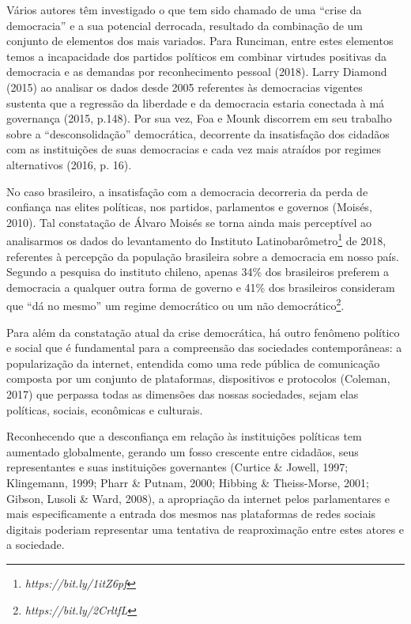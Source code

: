 Vários autores têm investigado o que tem sido chamado de uma ``crise da
democracia'' e a sua potencial derrocada, resultado da combinação de um
conjunto de elementos dos mais variados. Para Runciman, entre estes
elementos temos a incapacidade dos partidos políticos em combinar
virtudes positivas da democracia e as demandas por reconhecimento
pessoal (2018). Larry Diamond (2015) ao analisar os dados desde 2005
referentes às democracias vigentes sustenta que a regressão da liberdade
e da democracia estaria conectada à má governança (2015, p.148). Por sua
vez, Foa e Mounk discorrem em seu trabalho sobre a ``desconsolidação''
democrática, decorrente da insatisfação dos cidadãos com as instituições
de suas democracias e cada vez mais atraídos por regimes alternativos
(2016, p. 16).

No caso brasileiro, a insatisfação com a democracia decorreria da perda
de confiança nas elites políticas, nos partidos, parlamentos e governos
(Moisés, 2010). Tal constatação de Álvaro Moisés se torna ainda mais
perceptível ao analisarmos os dados do levantamento do Instituto
Latinobarômetro\footnote{\emph{https://bit.ly/1itZ6pf}}
de 2018, referentes à percepção da população brasileira sobre a
democracia em nosso país. Segundo a pesquisa do instituto chileno,
apenas 34\% dos brasileiros preferem a democracia a qualquer outra forma
de governo e 41\% dos brasileiros consideram que ``dá no mesmo'' um
regime democrático ou um não democrático\footnote{\emph{https://bit.ly/2CrltfL}}.

Para além da constatação atual da crise democrática, há outro fenômeno
político e social que é fundamental para a compreensão das sociedades
contemporâneas: a popularização da internet, entendida como uma rede
pública de comunicação composta por um conjunto de plataformas,
dispositivos e protocolos (Coleman, 2017) que perpassa todas as
dimensões das nossas sociedades, sejam elas políticas, sociais,
econômicas e culturais.

Reconhecendo que a desconfiança em relação às instituições políticas tem
aumentado globalmente, gerando um fosso crescente entre cidadãos, seus
representantes e suas instituições governantes (Curtice \& Jowell, 1997;
Klingemann, 1999; Pharr \& Putnam, 2000; Hibbing \& Theiss-Morse, 2001;
Gibson, Lusoli \& Ward, 2008), a apropriação da internet pelos
parlamentares e mais especificamente a entrada dos mesmos nas
plataformas de redes sociais digitais poderiam representar uma tentativa
de reaproximação entre estes atores e a sociedade.

